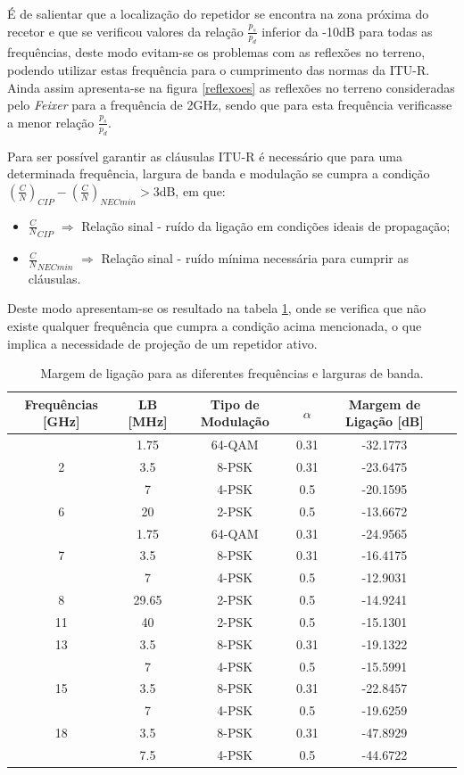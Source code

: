 É de salientar que a localização do repetidor se encontra na zona próxima do recetor e que se verificou valores da relação $\frac{p_{s}}{p_{d}}$ inferior da -10dB para todas as frequências, deste modo evitam-se os problemas com as reflexões no terreno, podendo utilizar estas frequência para o cumprimento das normas da ITU-R. Ainda assim apresenta-se na figura \ref{reflexoes} as reflexões no terreno consideradas pelo \textit{Feixer} para a frequência de 2GHz, sendo que para esta frequência verificasse a menor relação $\frac{p_{s}}{p_{d}}$.

Para ser possível garantir as cláusulas ITU-R é necessário que para uma determinada frequência, largura de banda e modulação se cumpra a condição $(\frac{C}{N})_{CIP} - (\frac{C}{N})_{NECmin}> 3 $dB, em que:
\begin{itemize}
\item $\frac{C}{N}_{CIP}$ $\Rightarrow$ Relação sinal - ruído da ligação em condições ideais de propagação;
\item $\frac{C}{N}_{NECmin}$ $\Rightarrow$ Relação sinal - ruído mínima necessária para cumprir as cláusulas.
\end{itemize}

Deste modo apresentam-se os resultado na tabela \ref{margemLigacao}, onde se verifica que não existe qualquer frequência que cumpra a condição acima mencionada, o que implica a necessidade de projeção de um repetidor ativo.  
\begin{table}[H]
\centering
\begin{tabular}{|c|c|c|c|c|c|}
\hline
Frequências [GHz] & LB [MHz] & Tipo de Modulação & $\alpha$ & Margem de Ligação [dB] \\
\hline
 & 1.75 & 64-QAM & 0.31 & -32.1773\\
2 & 3.5 & 8-PSK & 0.31 & -23.6475\\
 & 7 & 4-PSK & 0.5 & -20.1595\\
\hline
 6 & 20 & 2-PSK & 0.5 & -13.6672\\
\hline
 & 1.75 & 64-QAM & 0.31 & -24.9565\\
7 & 3.5 & 8-PSK & 0.31 & -16.4175\\
 &7 & 4-PSK & 0.5 & -12.9031\\
\hline
8 & 29.65 & 2-PSK & 0.5 & -14.9241\\
\hline
11 & 40 & 2-PSK & 0.5 & -15.1301\\
\hline
13 & 3.5 & 8-PSK & 0.31 & -19.1322\\
& 7 & 4-PSK & 0.5 & -15.5991\\
\hline
15 & 3.5 & 8-PSK & 0.31 & -22.8457\\
 & 7 & 4-PSK & 0.5 & -19.6259\\
\hline
18 & 3.5 & 8-PSK & 0.31 & -47.8929\\
& 7.5 & 4-PSK & 0.5 & -44.6722\\ 
\hline
\end{tabular}
\caption{Margem de ligação para as diferentes frequências e larguras de banda.}
\label{margemLigacao}
\end{table}

